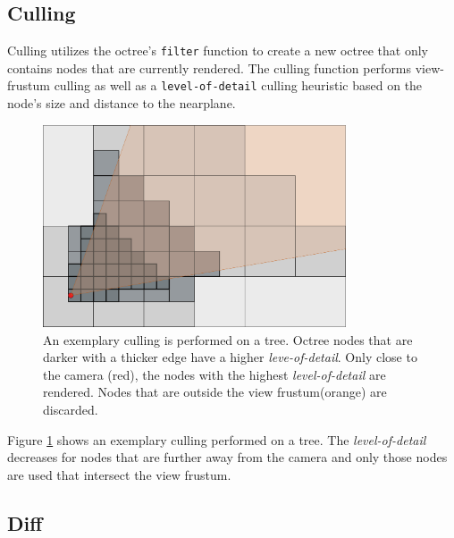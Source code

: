 \subsection{Culling}

Culling utilizes the octree's \verb|filter| function to create a new octree that only contains nodes that are currently rendered. The culling function performs view-frustum culling as well as a \verb|level-of-detail| culling heuristic based on the node's size and distance to the nearplane. 

\begin{figure}
    \centering
    \includegraphics[width=0.8\textwidth]{Implementation/octreeCulling.png}
    \caption{An exemplary culling is performed on a tree. Octree nodes that are darker with a thicker edge have a higher \textit{leve-of-detail}. Only close to the camera (red), the nodes with the highest \textit{level-of-detail} are rendered. Nodes that are outside the view frustum(orange) are discarded. }
    \label{fig:octreeCulling}
\end{figure}

Figure \ref{fig:octreeCulling} shows an exemplary culling performed on a tree. The \textit{level-of-detail} decreases for nodes that are further away from the camera and only those nodes are used that intersect the view frustum. 

\subsection{Diff}

